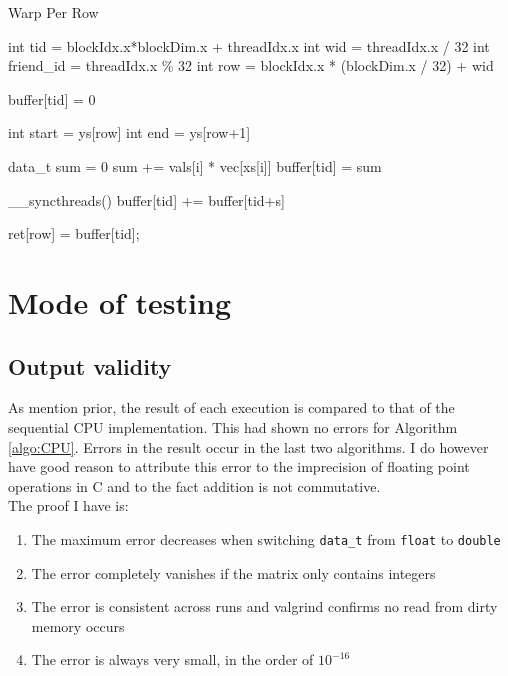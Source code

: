 \documentclass{article}
\begin{document}
\begin{algorithm}[ht]
    \caption{Warp Per Row}
    int tid = blockIdx.x*blockDim.x + threadIdx.x 
    int wid = threadIdx.x / 32 
    int friend\_id = threadIdx.x \% 32 
    int row = blockIdx.x * (blockDim.x / 32) + wid 

    buffer[tid] = 0 
     {
        int start = ys[row]\;
        int end = ys[row+1]\;

        data\_t sum = 0\;
         {
            sum += vals[i] * vec[xs[i]]\;
        }
        buffer[tid] = sum\;
    }

     {
        \_\_syncthreads() 
         {
            buffer[tid] += buffer[tid+s]\;
        }
    }

     {
        ret[row] = buffer[tid];
    }
\end{algorithm}


\section{Mode of testing}
\subsection{Output validity}
As mention prior, the result of each execution is compared to that of the sequential CPU implementation. This had shown no errors for Algorithm \ref{algo:CPU}.
Errors in the result occur in the last two algorithms. I do however have good reason to attribute this error to the imprecision of floating point operations in C and to the fact addition is not commutative.\\
The proof I have is:
\begin{enumerate}
    \item The maximum error decreases when switching \texttt{data\_t} from \texttt{float} to \texttt{double}
    \item The error completely vanishes if the matrix only contains integers
    \item The error is consistent across runs and valgrind confirms no read from dirty memory occurs
    \item The error is always very small, in the order of $10^{-16}$
\end{enumerate}
\end{document}
